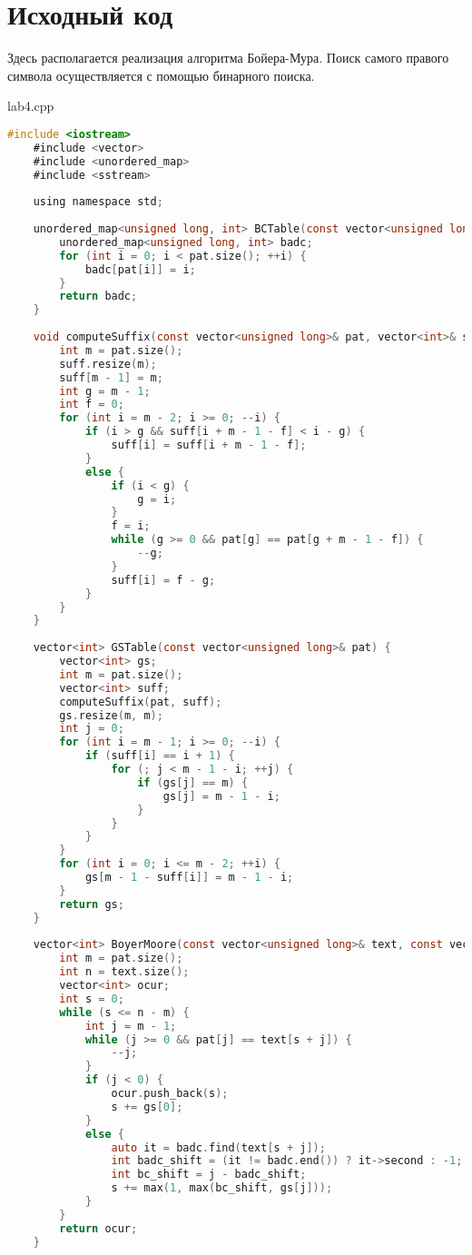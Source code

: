 \documentclass[pdf, unicode, 12pt, a4paper,oneside,fleqn]{article}
\begin{document}
\section{Исходный код}

Здесь располагается реализация алгоритма Бойера-Мура. Поиск самого правого символа осуществляется с помощью бинарного поиска.


lab4.cpp
\begin{lstlisting}[language=C]
    #include <iostream>
    #include <vector>
    #include <unordered_map>
    #include <sstream>
    
    using namespace std;
    
    unordered_map<unsigned long, int> BCTable(const vector<unsigned long>& pat) {
        unordered_map<unsigned long, int> badc;
        for (int i = 0; i < pat.size(); ++i) {
            badc[pat[i]] = i; 
        }
        return badc;
    }
    
    void computeSuffix(const vector<unsigned long>& pat, vector<int>& suff) {
        int m = pat.size();
        suff.resize(m);
        suff[m - 1] = m;
        int g = m - 1;
        int f = 0;
        for (int i = m - 2; i >= 0; --i) {
            if (i > g && suff[i + m - 1 - f] < i - g) {
                suff[i] = suff[i + m - 1 - f];
            }
            else {
                if (i < g) {
                    g = i;
                }
                f = i;
                while (g >= 0 && pat[g] == pat[g + m - 1 - f]) {
                    --g;
                }
                suff[i] = f - g;
            }
        }
    }
    
    vector<int> GSTable(const vector<unsigned long>& pat) {
        vector<int> gs;
        int m = pat.size();
        vector<int> suff;
        computeSuffix(pat, suff);
        gs.resize(m, m);
        int j = 0;
        for (int i = m - 1; i >= 0; --i) {
            if (suff[i] == i + 1) {
                for (; j < m - 1 - i; ++j) {
                    if (gs[j] == m) {
                        gs[j] = m - 1 - i;
                    }
                }
            }
        }
        for (int i = 0; i <= m - 2; ++i) {
            gs[m - 1 - suff[i]] = m - 1 - i; 
        }
        return gs;
    }
    
    vector<int> BoyerMoore(const vector<unsigned long>& text, const vector<unsigned long>& pat, const unordered_map<unsigned long, int>& badc, const vector<int>& gs){
        int m = pat.size();
        int n = text.size();
        vector<int> ocur;
        int s = 0; 
        while (s <= n - m) {
            int j = m - 1; 
            while (j >= 0 && pat[j] == text[s + j]) {
                --j;
            }
            if (j < 0) {
                ocur.push_back(s);
                s += gs[0];  
            }
            else {
                auto it = badc.find(text[s + j]);
                int badc_shift = (it != badc.end()) ? it->second : -1;
                int bc_shift = j - badc_shift;
                s += max(1, max(bc_shift, gs[j])); 
            }
        }
        return ocur;
    }
    

\end{lstlisting}
\end{document}
